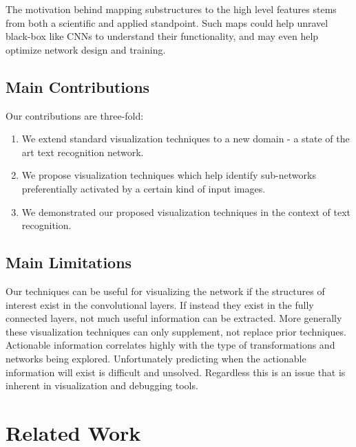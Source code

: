 \documentclass[10pt,twocolumn,letterpaper]{article}
\begin{document}
The motivation behind mapping substructures to the high level features stems from both a scientific and applied standpoint. Such maps could help unravel black-box like CNNs to understand their functionality, and may even help optimize network design and training.


\subsection{Main Contributions}
Our contributions are three-fold:
\begin{enumerate}
\item We extend standard visualization techniques to a new domain - a state of the art text recognition network.


\item We propose visualization techniques which help identify sub-networks preferentially activated by a certain kind of input images.


\item We demonstrated our proposed visualization techniques in the context of text recognition.
\end{enumerate}


\subsection{Main Limitations}
Our techniques can be useful for visualizing the network if the structures of interest exist in the convolutional layers. If instead they exist in the fully connected layers, not much useful information can be extracted. More generally these visualization techniques can only supplement, not replace prior techniques. Actionable information correlates highly with the type of transformations and networks being explored. Unfortunately predicting when the actionable information will exist is difficult and unsolved. Regardless this is an issue that is inherent in visualization and debugging tools.


\section{Related Work}
\end{document}
